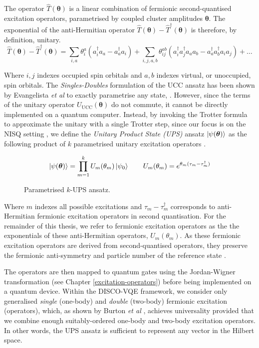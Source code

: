 The operator $\hat T(\bm\theta)$ is a linear combination of fermionic second-quantised excitation operators, parametrised by coupled cluster amplitudes $\bm\theta$. The exponential of the anti-Hermitian operator $\hat T(\bm\theta) - \hat T^\dagger(\bm\theta)$ is therefore, by definition, unitary. 
\begin{equation*}
\hat T(\bm{\theta}) - \hat T^{\dagger}(\bm{\theta}) =
\sum_{i, a} \theta^a_i (a^\dagger_i a_a - a^\dagger_a a_i) + 
\sum_{i, j, a, b} \theta^{ab}_{ij} (a^\dagger_i a^\dagger_j a_a a_b - a^\dagger_a a^\dagger_b a_i a_j) + \dots
\end{equation*}

Where $i, j$ indexes occupied spin orbitals and $a, b$ indexes virtual, or unoccupied, spin orbitals. The \textit{Singles-Doubles} formulation of the UCC ansatz has been shown by Evangelista \textit{et al} to exactly parametrise any state, \cite{Evangelista2019}. However, since the terms of the unitary operator $U_\text{UCC}(\bm\theta)$ do not commute, it cannot be directly implemented on a quantum computer. Instead, by invoking the Trotter formula to approximate the unitary with a single Trotter step, since our focus is on the NISQ setting \cite{Cowtan2020}, we define the \textit{Unitary Product State (UPS)} ansatz $\ket{\psi(\bm\theta)}$ as the following product of $k$ parametrised unitary excitation operators \cite{Burton2023}.

\begin{figure}[H]
    \centering
    \begin{equation*}
        \ket{\psi(\bm\theta)} = \prod_{m=1}^k U_m(\theta_m) \ket{\psi_0} \qquad
        U_m(\theta_m) = e^{\theta_m (\tau_m - \tau_m^\dagger)}
    \end{equation*}
    \caption{Parametrised $k$-UPS ansatz.}
\end{figure}

Where $m$ indexes all possible excitations and $\tau_m - \tau_m^\dagger$ corresponds to anti-Hermitian fermionic excitation operators in second quantisation. For the remainder of this thesis, we refer to fermionic excitation operators as the the exponentials of these anti-Hermitian operators, $U_m(\theta_m)$. As these fermionic excitation operators are derived from second-quantised operators, they preserve the fermionic anti-symmetry and particle number of the reference state \cite{Burton2023}.

The operators are then mapped to quantum gates using the Jordan-Wigner transformation (see Chapter \ref{excitation-operators}) before being implemented on a quantum device. Within the DISCO-VQE framework, we consider only generalised \textit{single} (one-body) and \textit{double} (two-body) fermionic excitation (operators), which, as shown by Burton \textit{et al} \cite{Burton2023}, achieves universality provided that we combine enough suitably-ordered one-body and two-body excitation operators. In other words, the UPS ansatz is sufficient to represent any vector in the Hilbert space.
